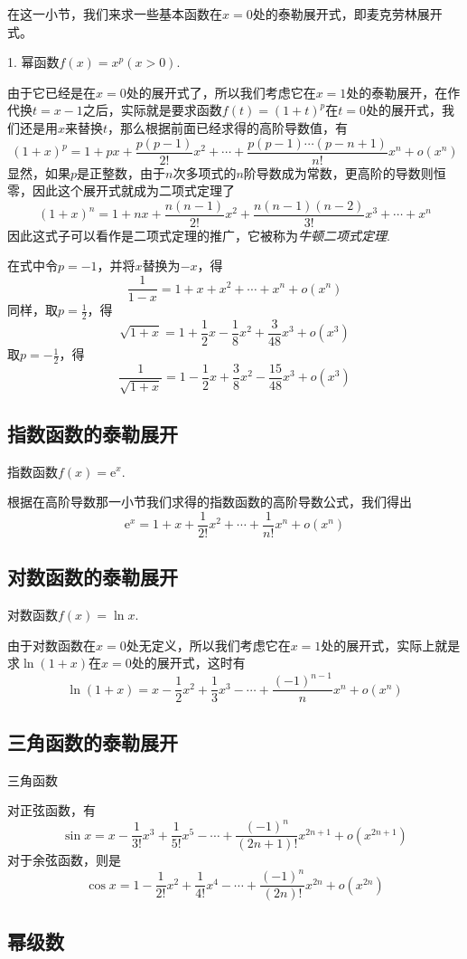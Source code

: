 在这一小节，我们来求一些基本函数在$x=0$处的泰勒展开式，即麦克劳林展开式。

1. 幂函数$f(x)=x^p(x>0)$.

由于它已经是在$x=0$处的展开式了，所以我们考虑它在$x=1$处的泰勒展开，在作代换$t=x-1$之后，实际就是要求函数$f(t)=(1+t)^p$在$t=0$处的展开式，我们还是用$x$来替换$t$，那么根据前面已经求得的高阶导数值，有
\[ (1+x)^p = 1 + px + \frac{p(p-1)}{2!}x^2 + \cdots + \frac{p(p-1)\cdots (p-n+1)}{n!}x^n + o(x^n) \]
显然，如果$p$是正整数，由于$n$次多项式的$n$阶导数成为常数，更高阶的导数则恒零，因此这个展开式就成为二项式定理了
\[ (1+x)^n = 1+nx + \frac{n(n-1)}{2!}x^2 + \frac{n(n-1)(n-2)}{3!}x^3 + \cdots + x^n \]
因此这式子可以看作是二项式定理的推广，它被称为\emph{牛顿二项式定理}.

在式中令$p=-1$，并将$x$替换为$-x$，得
\[ \frac{1}{1-x} = 1+x+x^2 + \cdots + x^n + o(x^n) \]
同样，取$p=\frac{1}{2}$，得
\[ \sqrt{1+x} = 1+\frac{1}{2}x-\frac{1}{8}x^2+\frac{3}{48}x^3 + o(x^3) \]
取$p=-\frac{1}{2}$，得
\[ \frac{1}{\sqrt{1+x}} = 1-\frac{1}{2}x+\frac{3}{8}x^2 -\frac{15}{48}x^3 + o(x^3) \]

\subsection{指数函数的泰勒展开}
\label{sec:taylor-expand-for-exp-function}

指数函数$f(x)=\mathrm{e}^x$.

根据在高阶导数那一小节我们求得的指数函数的高阶导数公式，我们得出
\[ \mathrm{e}^x = 1+x+\frac{1}{2!}x^2 + \cdots + \frac{1}{n!}x^n + o(x^n) \]

\subsection{对数函数的泰勒展开}
\label{sec:taylor-expand-for-ln-function}

对数函数$f(x)=\ln{x}$.

由于对数函数在$x=0$处无定义，所以我们考虑它在$x=1$处的展开式，实际上就是求$\ln{(1+x)}$在$x=0$处的展开式，这时有
\[ \ln{(1+x)} = x - \frac{1}{2} x^2 + \frac{1}{3} x^3 - \cdots + \frac{(-1)^{n-1}}{n}x^n + o(x^n) \]

\subsection{三角函数的泰勒展开}
\label{sec:taylor-expand-for-triangle-function}

三角函数

对正弦函数，有
\[ \sin{x} = x - \frac{1}{3!}x^3 + \frac{1}{5!} x^5 - \cdots + \frac{(-1)^n}{(2n+1)!}x^{2n+1} + o(x^{2n+1}) \]
对于余弦函数，则是
\[ \cos{x} = 1 - \frac{1}{2!}x^2 + \frac{1}{4!}x^4 - \cdots + \frac{(-1)^n}{(2n)!}x^{2n} + o(x^{2n}) \]

\subsection{幂级数}
\label{sec:power-series}



